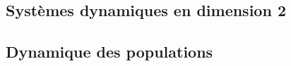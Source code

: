 \documentclass[french, 12pt]{article}
\numberwithin{exercise}{section}
\numberwithin{equation}{section}
\begin{document}
\subsection{Systèmes dynamiques en dimension 2}



\subsection{Dynamique des populations}



\end{document}
